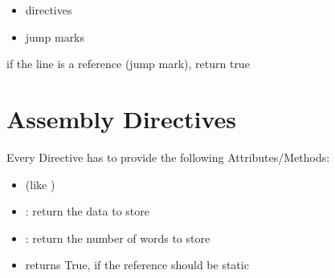 \documentclass[letterpaper,10pt,english]{sphinxmanual}
\begin{document}
\begin{fulllineitems}
\begin{fulllineitems}
\begin{itemize}
\item {} 
directives

\item {} 
jump marks

\end{itemize}

\end{fulllineitems}


\end{fulllineitems}


\begin{fulllineitems}
\label{tools:py_register_machine2.tools.assembler.assembler.isreference}
if the line is a reference (jump mark),
return true

\end{fulllineitems}



\section{Assembly Directives}
\label{tools:module-py_register_machine2.tools.assembler.directives}\label{tools:assembly-directives}

\begin{fulllineitems}
\label{tools:py_register_machine2.tools.assembler.directives.BaseDirective}
Every Directive has to provide the following Attributes/Methods:
\begin{itemize}
\item {} 
 (like )

\item {} 
: return the data to store

\item {} 
: return the number of words to store

\item {} 
 returns True, if the reference should be static

\end{itemize}

\end{fulllineitems}
\end{document}

